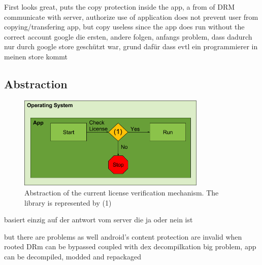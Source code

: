 First looks great, puts the copy protection inside the app, a from of DRM\newline
communicate with server, authorize use of application\newline
does not prevent user from copying/transfering app, but copy useless since the app does run without the correct account\newline
google die ersten, andere folgen, anfangs problem, dass dadurch nur durch google store geschützt war, grund dafür dass evtl ein programmierer in meinen store kommt\newline

\subsection{Abstraction} \label{section:license-abstraction}
\begin{figure}[h]
    \centering
    \includegraphics[width=0.8\textwidth]{data/verificationNow.png}
    \caption{Abstraction of the current license verification mechanism. The library is represented by (1)}
    \label{fig:verificationNow}
\end{figure}


basiert einzig auf der antwort vom server die ja oder nein ist


but there are problems as well
android's content protection are invalid when rooted
DRm can be bypassed
coupled with dex decompilkation big problem, app can be decompiled, modded and repackaged\cite{levinAndevcon}

